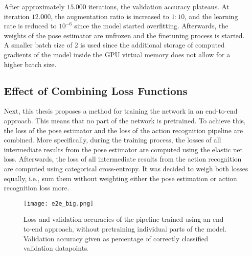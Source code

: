 
After approximately $15.000$ iterations, the validation accuracy plateaus.
At iteration $12.000$, the augmentation ratio is increased to $1:10$, and the learning rate is reduced to $10^{-6}$ since the model started overfitting.
Afterwards, the weights of the pose estimator are unfrozen and the finetuning process is started.
A smaller batch size of $2$ is used since the additional storage of computed gradients of the model inside the GPU virtual memory does not allow for a higher batch size.



\subsection{Effect of Combining Loss Functions}
Next, this thesis proposes a method for training the network in an end-to-end approach.
This means that no part of the network is pretrained.
To achieve this, the loss of the pose estimator and the loss of the action recognition pipeline are combined.
More specifically, during the training process, the losses of all intermediate results from the pose estimator are computed using the elastic net loss.
Afterwards, the loss of all intermediate results from the action recognition are computed using categorical cross-entropy.
It was decided to weigh both losses equally, i.e., sum them without weighting either the pose estimation or action recognition loss more.


\begin{figure}[htb!]
    \centering
    \texttt{[image: e2e\_big.png]}
    \caption{Loss and validation accuracies of the pipeline trained using an end-to-end approach, without pretraining individual parts of the model. Validation accuracy given as percentage of correctly classified validation datapoints.}
    \label{fig:e2e_big}
\end{figure}


